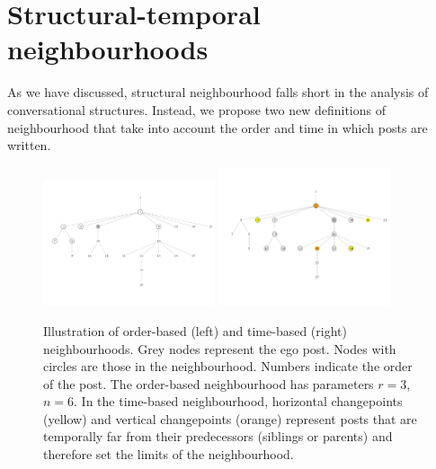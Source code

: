 \documentclass[conference]{IEEEtran}
\begin{document}
\section{Structural-temporal neighbourhoods}
As we have discussed, structural neighbourhood falls short in the analysis of conversational structures. Instead, we propose two new definitions of neighbourhood that take into account the order and time in which posts are written. 

\begin{figure}
\centering
\includegraphics[width=0.45\textwidth]{order_neighbourhood}
\includegraphics[width=0.45\textwidth]{breakpoints}
\caption{Illustration of order-based (left) and time-based (right) neighbourhoods. Grey nodes represent the ego post. Nodes with circles are those in the neighbourhood. Numbers indicate the order of the post. The order-based neighbourhood has parameters $r=3$, $n=6$. In the time-based neighbourhood, horizontal changepoints (yellow) and vertical changepoints (orange) represent posts that are temporally far from their predecessors (siblings or parents) and therefore set the limits of the neighbourhood.}
\label{fig:cutpoints}
\end{figure}
\end{document}

